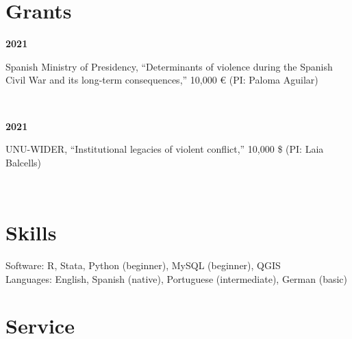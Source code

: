 \documentclass[a4paper, 12pt]{article}
\begin{document}
\section*{Grants}

\begin{minipage}[t]{0.1\textwidth}
\textbf{2021}
\end{minipage}\hfill\begin{minipage}[t]{0.9\textwidth}
Spanish Ministry of Presidency, ``Determinants of violence during the Spanish Civil War and its long-term consequences,'' 10,000 € (PI: Paloma Aguilar)\\\vspace{-8pt}
\end{minipage}\\
\begin{minipage}[t]{0.1\textwidth}
\textbf{2021}
\end{minipage}\hfill\begin{minipage}[t]{0.9\textwidth}
UNU-WIDER, ``Institutional legacies of violent conflict,'' 10,000 \$ (PI: Laia Balcells)
\end{minipage}\\


\vspace{-10pt}
\section*{Skills}

Software: R, Stata, Python (beginner), MySQL (beginner), QGIS\\
Languages: English, Spanish (native), Portuguese (intermediate), German (basic)

\vspace{-10pt}
\section*{Service}

%
\end{document}

